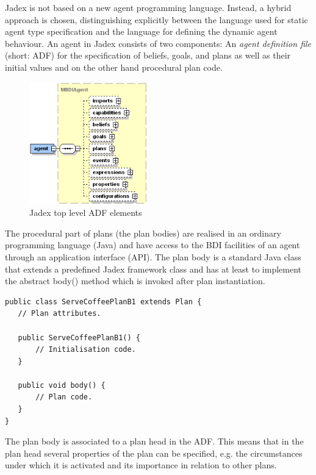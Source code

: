 Jadex is not based on a new agent programming language.
Instead, a hybrid approach is chosen, distinguishing explicitly between the language used for static agent type specification and the language for defining the dynamic agent behaviour.
An agent in Jadex consists of two components: An \emph{agent definition file} (short: ADF) for the specification of beliefs, goals, and plans as well as their initial values and on the other hand procedural plan code.
\begin{figure}
	\centering
	\includegraphics[height=200px]{images/jadexagentadf.png}
  \caption{Jadex top level ADF elements \cite{ActiveComponents}}
	\label{fig3}
\end{figure}
The procedural part of plans (the plan bodies) are realised in an ordinary programming language (Java) and have access to the BDI facilities of an agent through an application interface (API).
The plan body is a standard Java class that extends a predefined Jadex framework class and has at least to implement the abstract body() method which is invoked after plan instantiation.
\begin{lstlisting}
public class ServeCoffeePlanB1 extends Plan {
   // Plan attributes.

   public ServeCoffeePlanB1() {
       // Initialisation code.
   }

   public void body() {
       // Plan code.
   }
}
\end{lstlisting}
The plan body is associated to a plan head in the ADF.
This means that in the plan head several properties of the plan can be specified, e.g. the circumstances under which it is activated and its importance in relation to other plans.
